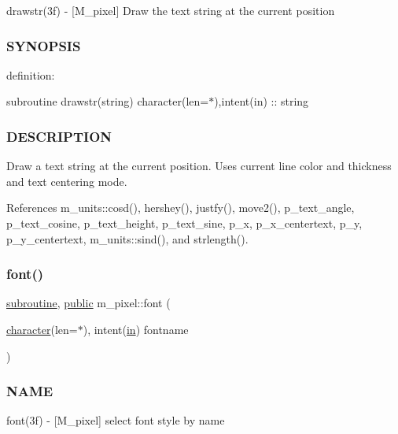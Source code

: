 drawstr(3f) -\/ \mbox{[}M\+\_\+pixel\mbox{]} Draw the text string at the current position 

\subsubsection*{S\+Y\+N\+O\+P\+S\+IS}

definition\+:

subroutine drawstr(string) character(len=$\ast$),intent(in) \+:\+: string

\subsubsection*{D\+E\+S\+C\+R\+I\+P\+T\+I\+ON}

Draw a text string at the current position. Uses current line color and thickness and text centering mode. 

References m\+\_\+units\+::cosd(), hershey(), justfy(), move2(), p\+\_\+text\+\_\+angle, p\+\_\+text\+\_\+cosine, p\+\_\+text\+\_\+height, p\+\_\+text\+\_\+sine, p\+\_\+x, p\+\_\+x\+\_\+centertext, p\+\_\+y, p\+\_\+y\+\_\+centertext, m\+\_\+units\+::sind(), and strlength().

\mbox{\label{namespacem__pixel_a566adb827a3a26ba42d4e86e4c6e12af}} 
\subsubsection{\texorpdfstring{font()}{font()}}
{\footnotesize\ttfamily \hyperlink{M__stopwatch_83_8txt_acfbcff50169d691ff02d4a123ed70482}{subroutine}, \hyperlink{M__stopwatch_83_8txt_a2f74811300c361e53b430611a7d1769f}{public} m\+\_\+pixel\+::font (\begin{DoxyParamCaption}\item[{\hyperlink{option__stopwatch_83_8txt_abd4b21fbbd175834027b5224bfe97e66}{character}(len=$\ast$), intent(\hyperlink{M__journal_83_8txt_afce72651d1eed785a2132bee863b2f38}{in})}]{fontname }\end{DoxyParamCaption})}



\subsubsection*{N\+A\+ME}

font(3f) -\/ \mbox{[}M\+\_\+pixel\mbox{]} select font style by name 

